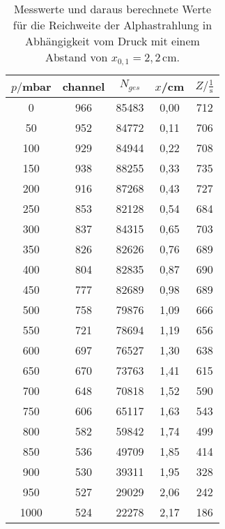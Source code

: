 \begin{table}[htp]
	\begin{center}
    \caption{Messwerte und daraus berechnete Werte für die Reichweite der Alphastrahlung
    in Abhängigkeit vom Druck mit einem Abstand von $x_{0,1}=2{,}2\,$cm.}
    \label{tab:druck1}
		\begin{tabular}{ccccc}
		\toprule
			{$p/$mbar} & {channel} & {$N_{ges}$} & {$x$/cm} & {$Z/\frac{1}{\text{s}}$}\\
			\midrule
			0 & 966 & 85483 & 0,00 & 712\\
			50 & 952 & 84772 & 0,11 & 706\\
			100 & 929 & 84944 & 0,22 & 708\\
			150 & 938 & 88255 & 0,33 & 735\\
			200 & 916 & 87268 & 0,43 & 727\\
			250 & 853 & 82128 & 0,54 & 684\\
			300 & 837 & 84315 & 0,65 & 703\\
			350 & 826 & 82626 & 0,76 & 689\\
			400 & 804 & 82835 & 0,87 & 690\\
			450 & 777 & 82689 & 0,98 & 689\\
			500 & 758 & 79876 & 1,09 & 666\\
			550 & 721 & 78694 & 1,19 & 656\\
			600 & 697 & 76527 & 1,30 & 638\\
			650 & 670 & 73763 & 1,41 & 615\\
			700 & 648 & 70818 & 1,52 & 590\\
			750 & 606 & 65117 & 1,63 & 543\\
			800 & 582 & 59842 & 1,74 & 499\\
			850 & 536 & 49709 & 1,85 & 414\\
			900 & 530 & 39311 & 1,95 & 328\\
			950 & 527 & 29029 & 2,06 & 242\\
			1000 & 524 & 22278 & 2,17 & 186\\
		\bottomrule
		\end{tabular}
	\end{center}
\end{table}

